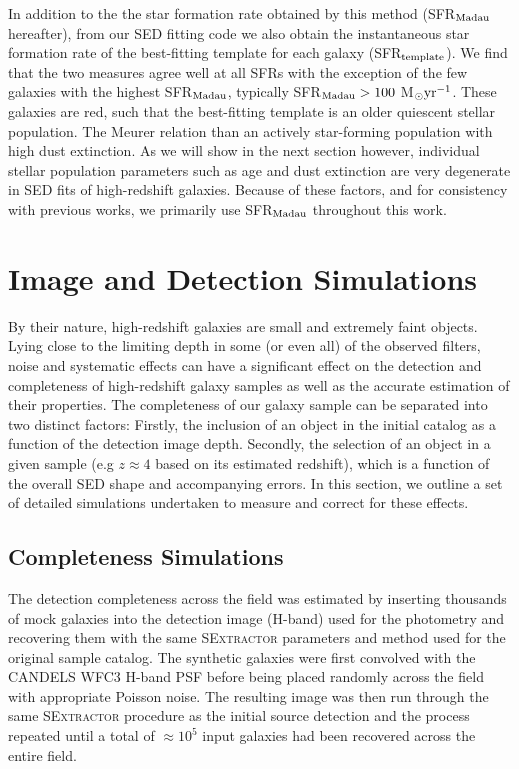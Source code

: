 In addition to the the star formation rate obtained by this method (SFR$_{\rm{Madau}}$ hereafter), from our SED fitting code we also obtain the instantaneous star formation rate of the best-fitting template for each galaxy (SFR$_{\rm{template}}$). We find that the two measures agree well at all SFRs with the exception of the few galaxies with the highest SFR$_{\rm{Madau}}$, typically SFR$_{\rm{Madau}} > 100$ M$_{\odot} \textup{yr}^{-1}$. These galaxies are red, such that the best-fitting template is an older quiescent stellar population. The Meurer relation  than an actively star-forming population with high dust extinction. As we will show in the next section however, individual stellar population parameters such as age and dust extinction are very degenerate in SED fits of high-redshift galaxies. Because of these factors, and for consistency with previous works, we primarily use SFR$_{\rm{Madau}}$ throughout this work.

\section{Image and Detection Simulations}\label{sec:simulations}
By their nature, high-redshift galaxies are small and extremely faint objects. Lying close to the limiting depth in some (or even all) of the observed filters, noise and systematic effects can have a significant effect on the detection and completeness of high-redshift galaxy samples as well as the accurate estimation of their properties. The completeness of our galaxy sample can be separated into two distinct factors: Firstly, the inclusion of an object in the initial catalog as a function of the detection image depth. Secondly, the selection of an object in a given sample (e.g $z\approx4$ based on its estimated redshift), which is a function of the overall SED shape and accompanying errors. In this section, we outline a set of detailed simulations undertaken to measure and correct for these effects.

\subsection{Completeness Simulations}\label{sec:completeness}
The detection completeness across the field was estimated by inserting thousands of mock galaxies into the detection image (H-band) used for the photometry and recovering them with the same \textsc{SExtractor} parameters and method used for the original sample catalog. The synthetic galaxies were first convolved with the CANDELS WFC3 H-band PSF before being placed randomly across the field with appropriate Poisson noise. The resulting image was then run through the same \textsc{SExtractor} procedure as the initial source detection and the process repeated until a total of $\approx  10^{5}$ input galaxies had been recovered across the entire field.

